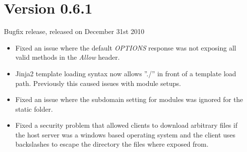 \documentclass[a4paper,12pt]{sphinxmanual}
\begin{document}
\section{Version 0.6.1}
\label{changelog:version-0-6-1}
Bugfix release, released on December 31st 2010
\begin{itemize}
\item {} 
Fixed an issue where the default \emph{OPTIONS} response was
not exposing all valid methods in the \emph{Allow} header.

\item {} 
Jinja2 template loading syntax now allows ''./'' in front of
a template load path.  Previously this caused issues with
module setups.

\item {} 
Fixed an issue where the subdomain setting for modules was
ignored for the static folder.

\item {} 
Fixed a security problem that allowed clients to download arbitrary files
if the host server was a windows based operating system and the client
uses backslashes to escape the directory the files where exposed from.

\end{itemize}
\end{document}
